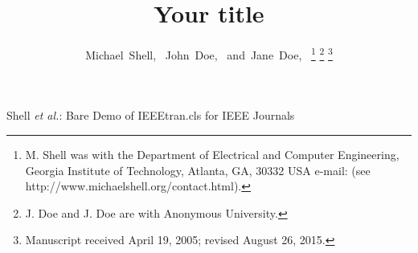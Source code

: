 \documentclass[journal]{IEEEtran}
\begin{document}
%
\title{Your title}
%
%
%

\author{Michael~Shell,~
        John~Doe,~
        and~Jane~Doe,~%
\thanks{M. Shell was with the Department
of Electrical and Computer Engineering, Georgia Institute of Technology, Atlanta,
GA, 30332 USA e-mail: (see http://www.michaelshell.org/contact.html).}%
\thanks{J. Doe and J. Doe are with Anonymous University.}%
\thanks{Manuscript received April 19, 2005; revised August 26, 2015.}}

% 
%



%
{Shell \MakeLowercase{\textit{et al.}}: Bare Demo of IEEEtran.cls for IEEE Journals}
% 
\end{document}
